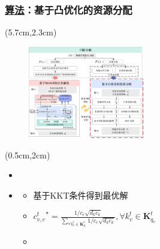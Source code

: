 \begin{frame}
\frametitle{\englishfont \underline{算法}：基于凸优化的资源分配}
\newBackground
\begin{center}
\begin{textblock*}{\textwidth}(5.7cm,2.3cm)
\begin{figure}
\includegraphics[width=0.45\textwidth]{fig/Fig3-3-solution-model3.pdf}
\end{figure}
\end{textblock*}
\end{center}

\begin{center}
\begin{textblock*}{0.62\textwidth}(0.5cm,2cm)
\begin{itemize}[itemsep=0.2\baselineskip]  \englishfont
	\item[\ding{111}] {\color{cqublue}{传输功率分配}}
	\begin{itemize}[itemsep=0.2\baselineskip] 
	\end{itemize}
	\item[\ding{111}] {\color{cqublue}{计算资源分配}}
	\begin{itemize}[itemsep=0.2\baselineskip]  \small
			\item[\ding{226}] 基于KKT条件得到最优解
			\item ${c_{v, e}^{t}}^{\star} = \frac{1 / c_e \sqrt{d_k  c_k} } {\sum_{\forall k_{v}^{t} \in {\mathbf{K}_{q_e}^{t} }} 1 / c_e \sqrt{d_k  c_k}} , \forall k_{v}^{t} \in {\mathbf{K}_{q_e}^{t} } $
			\item 
		\end{itemize}
\end{itemize}
\end{textblock*}
\end{center}
\end{frame}

